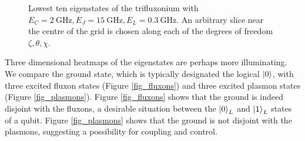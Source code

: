 \documentclass[11pt]{article}
\begin{document}
\begin{figure}
	\centering
	\caption{Lowest ten eigenstates of the trifluxonium with $E_C = \SI{2}{\giga\hertz}, E_J = \SI{15}{\giga\hertz}, E_L = \SI{0.3}{\giga\hertz}$. An arbitrary slice near the centre of the grid is chosen along each of the degrees of freedom $\zeta, \theta, \chi$.}
	\label{fig_estates}
\end{figure}

Three dimensional heatmaps of the eigenstates are perhaps more illuminating. We compare the ground state, which is typically designated the logical $\ket{0}$, with three excited fluxon states (Figure \ref{fig_fluxons}) and three excited plasmon states (Figure \ref{fig_plasmons}). Figure \ref{fig_fluxons} shows that the ground is indeed disjoint with the fluxons, a desirable situation between the $\ket{0}_L$ and $\ket{1}_L$ states of a qubit. Figure \ref{fig_plasmons} shows that the ground is not disjoint with the plasmons, suggesting a possibility for coupling and control.
\end{document}
